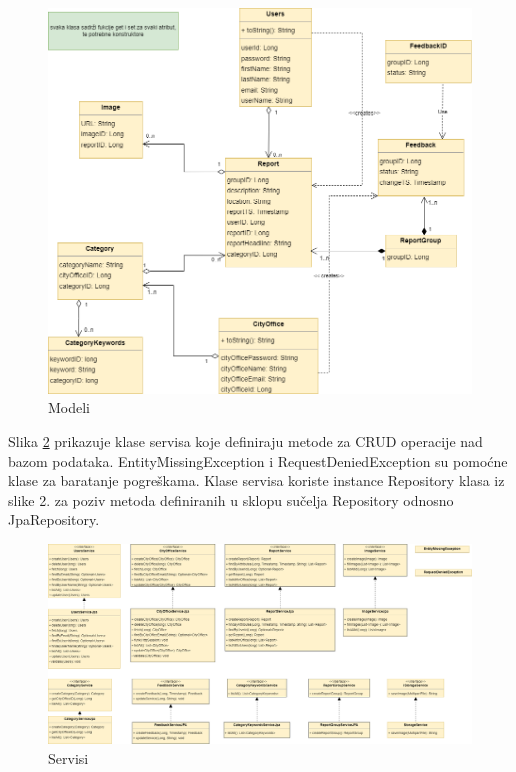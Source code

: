 			\begin{figure}[H]
				\includegraphics[width=\textwidth]{slike/repo.png} %
				\caption{Modeli}
				\label{fig:repo} %
			\end{figure}
			
			\eject
			
			Slika \ref{fig:service} prikazuje klase servisa koje definiraju metode za CRUD operacije nad bazom podataka. EntityMissingException i RequestDeniedException su pomoćne klase za baratanje pogreškama. Klase servisa koriste instance Repository klasa iz slike 2. za poziv metoda definiranih u sklopu sučelja Repository odnosno JpaRepository.
			
			\begin{figure}[H]
				\includegraphics[width=\textwidth]{slike/service.png} %
				\caption{Servisi}
				\label{fig:service} %
			\end{figure}
			
			\eject
			
